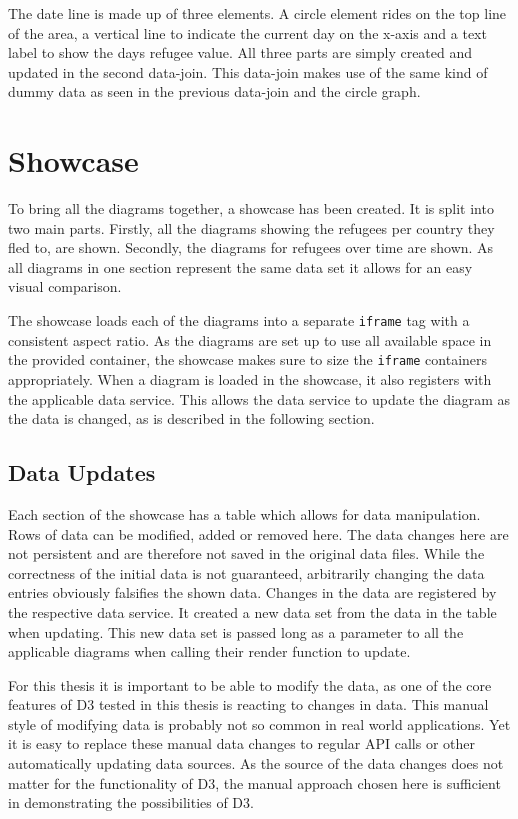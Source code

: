 The date line is made up of three elements. A circle element rides on the top line of the area, a vertical line to indicate the current day on the x-axis and a text label to show the days refugee value. All three parts are simply created and updated in the second data-join. This data-join makes use of the same kind of dummy data as seen in the previous data-join and the circle graph.


\section{Showcase} \label{sec:showcase}

To bring all the diagrams together, a showcase has been created. It  is split into two main parts. Firstly, all the diagrams showing the  refugees per country they fled to, are shown. Secondly, the diagrams for refugees over time are shown. As all diagrams in one section represent the same data set it allows for an easy visual comparison.

The showcase loads each of the diagrams into a separate \texttt{iframe} tag with a consistent aspect ratio. As the diagrams are set up to use all available space in the provided container, the showcase makes sure to size the \texttt{iframe} containers appropriately. When a diagram is loaded in the showcase, it also registers with the applicable data service. This allows the data service to update the diagram as the data is changed, as is described in the following section.

\subsection{Data Updates}

Each section of the showcase has a table which allows for data manipulation. Rows of data can be modified, added or removed here. The data changes here are not persistent and are therefore not saved in the original data files. While the correctness of the initial data is not guaranteed, arbitrarily changing the data entries obviously falsifies the shown data. Changes in the data are registered by the respective data service. It created a new data set from the data in the table when updating. This new data set is passed long as a parameter to all the applicable diagrams when calling their render function to update.

For this thesis it is important to be able to modify the data, as one of the core features of D3 tested in this thesis is reacting to changes in data. This manual style of modifying data is probably not so common in real world applications. Yet it is easy to replace these manual data changes to regular API calls or other automatically updating data sources. As the source of the data changes does not matter for the functionality of D3, the manual approach chosen here is sufficient in demonstrating the possibilities of D3.
